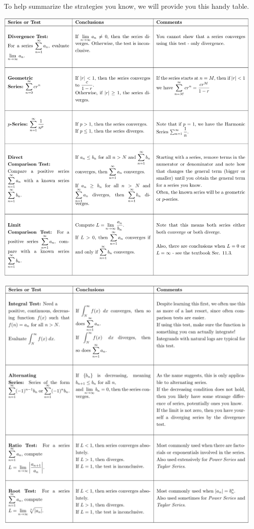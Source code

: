 \documentclass{ximera}
\theoremstyle{definition}
\begin{document}
To help summarize the strategies you know, we will provide you this handy table.

\begin{image}
\includegraphics{Strat_Table1.png}
\end{image}
\begin{image}
\includegraphics{Strat_Table2.png}
\end{image}
\end{document}
